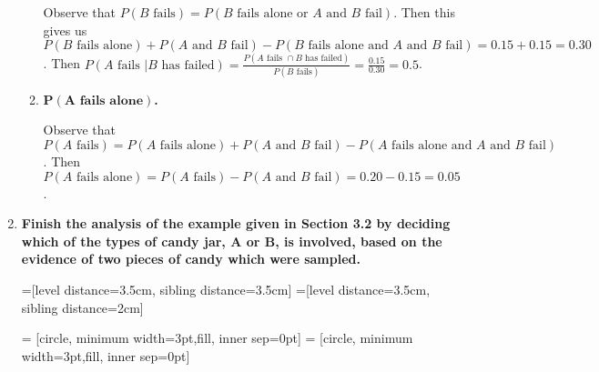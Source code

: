 \documentclass[10pt, oneside]{article}   	%
\theoremstyle{definition}
\begin{document}
\begin{enumerate}[label=3.\arabic*]
\begin{enumerate}
	Observe that $P(B \text{ fails}) = P(B \text{ fails alone or } A \text{ and } B \text{ fail})$. Then this gives us $P(B \text{ fails alone}) + P(A \text{ and } B \text{ fail}) - P(B \text{ fails alone and } A \text{ and } B \text{ fail}) = 0.15 + 0.15 = 0.30$. Then $P(A \text{ fails } | B \text{ has failed}) = \frac{P(A \text{ fails } \cap B \text{ has failed})}{P(B \text{ fails})} = \frac{0.15}{0.30} = \boxed{0.5}$.
	
	\item  \begin{tcolorbox}[
	  colback=Cerulean!5!white,
	  colframe=Cerulean!75!black]
	\textbf{$\bm{P(A \text{ fails alone})}$.}
	\end{tcolorbox}
	
	Observe that $P(A \text{ fails}) = P(A \text{ fails alone}) + P(A \text{ and } B \text{ fail}) - P(A \text{ fails alone and } A \text{ and } B \text{ fail})$. Then $P(A \text{ fails alone}) = P(A \text{ fails}) - P(A \text{ and } B \text{ fail}) = 0.20 - 0.15 = \boxed{0.05}$.
	\end{enumerate}

\item  \begin{tcolorbox}[
  colback=Cerulean!5!white,
  colframe=Cerulean!75!black]
\textbf{Finish the analysis of the example given in Section 3.2 by deciding which of the types of candy jar, $\bm{A}$ or $\bm{B}$, is involved, based on the evidence of two pieces of candy which were sampled.}
\end{tcolorbox}

=[level distance=3.5cm, sibling distance=3.5cm]
=[level distance=3.5cm, sibling distance=2cm]

 = [circle, minimum width=3pt,fill, inner sep=0pt]
 = [circle, minimum width=3pt,fill, inner sep=0pt]


\end{enumerate}
\end{document}
